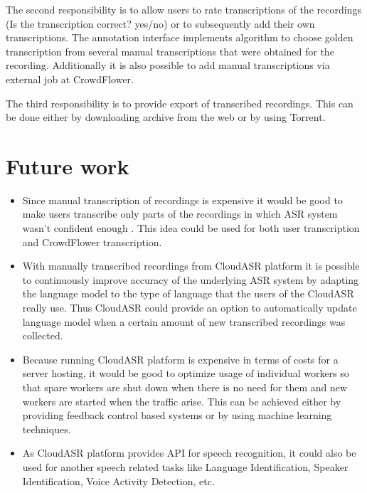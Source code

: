 The second responsibility is to allow users to rate transcriptions of the recordings (Is the transcription correct? yes/no) or to subsequently add their own transcriptions.
The annotation interface implements algorithm to choose golden transcription from several manual transcriptions
  that were obtained for the recording.
Additionally it is also possible to add manual transcriptions via external job at CrowdFlower.

The third responsibility is to provide export of transcribed recordings.
This can be done either by downloading archive from the web or by using Torrent.

\section*{Future work}
\begin{itemize}
  \item
    Since manual transcription of recordings is expensive
      it would be good to make users transcribe only parts of the recordings
      in which ASR system wasn't confident enough .
    This idea could be used for both user transcription and CrowdFlower transcription.

  \item
    With manually transcribed recordings from CloudASR platform
      it is possible to continuously improve accuracy of the underlying ASR system
      by adapting the language model to the type of language that the users of the CloudASR really use.
    Thus CloudASR could provide an option to automatically update language model
      when a certain amount of new transcribed recordings was collected.

  \item
    Because running CloudASR platform is expensive in terms of costs for a server hosting,
      it would be good to optimize usage of individual workers
      so that spare workers are shut down when there is no need for them
      and new workers are started when the traffic arise.
    This can be achieved either by providing feedback control based systems 
      or by using machine learning techniques. 

  \item
    As CloudASR platform provides API for speech recognition,
      it could also be used for another speech related tasks like Language Identification, Speaker Identification, Voice Activity Detection, etc.

\end{itemize}


